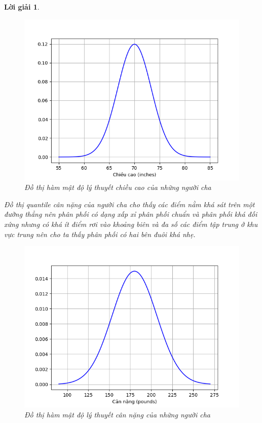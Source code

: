 \documentclass[14pt, a4paper]{article}
\theoremstyle{sltheorem}
\theoremstyle{soltheorem}
\newtheorem*{loigiai}{Lời giải}
\begin{document}
\begin{loigiai}
\begin{enumerate}[wide, labelwidth=!, labelindent=0pt,label=\textbf{\arabic*}.]
        \begin{figure}[h!]
            \centering
            \includegraphics[scale=0.7]{4.1.png}
            \caption{Đồ thị hàm mật độ lý thuyết chiều cao của những người cha}
        \end{figure}

        Đồ thị quantile cân nặng của người cha cho thấy các điểm nằm khá sát trên một đường thẳng nên phân phối có dạng xấp xỉ phân phối chuẩn và phân phối khá đối xứng nhưng có khá ít điểm rơi vào khoảng biên và đa số các điểm tập trung ở khu vực trung nên cho ta thấy phân phối có hai bên đuôi khá nhẹ.
        
        \begin{figure}[h!]
            \centering
            \includegraphics[scale=0.7]{4.2.png}
            \caption{Đồ thị hàm mật độ lý thuyết cân nặng của những người cha}
        \end{figure}


\end{enumerate}
\end{loigiai}
\end{document}
